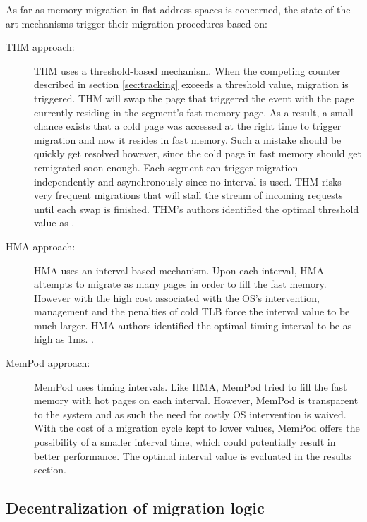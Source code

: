 As far as memory migration in flat address spaces is concerned, the state-of-the-art mechanisms trigger their migration procedures based on:
\begin{description}
	\item[THM approach:] THM uses a threshold-based mechanism. When the competing counter described in section \ref{sec:tracking} exceeds a threshold value, migration is triggered. THM will swap the page that triggered the event with the page currently residing in the segment's fast memory page. As a result, a small chance exists that a cold page was accessed at the right time to trigger migration and now it resides in fast memory. Such a mistake should be quickly get resolved however, since the cold page in fast memory should get remigrated soon enough. Each segment can trigger migration independently and asynchronously since no interval is used. THM risks very frequent migrations that will stall the stream of incoming requests until each swap is finished.  THM's authors identified the optimal threshold value as . 
	\item[HMA approach:] HMA uses an interval based mechanism. Upon each interval, HMA attempts to migrate as many pages in order to fill the fast memory. However with the high cost associated with the OS's intervention, management and the penalties of cold TLB force the interval value to be much larger. HMA authors identified the optimal timing interval to be as high as 1ms. .
	\item[MemPod approach:] MemPod uses timing intervals. Like HMA, MemPod tried to fill the fast memory with hot pages on each interval. However, MemPod is transparent to the system and as such the need for costly OS intervention is waived. With the cost of a migration cycle kept to lower values, MemPod offers the possibility of a smaller interval time, which could potentially result in better performance. The optimal interval value is evaluated in the results section.
\end{description}

\subsection{Decentralization of migration logic}

